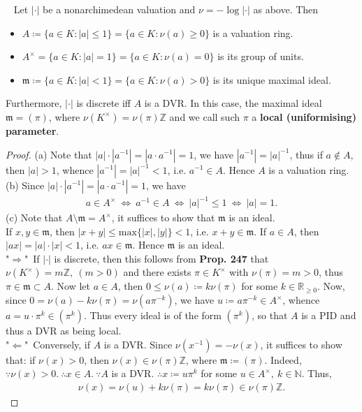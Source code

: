 \documentclass[12pt,a4paper,footinclude=true,headinclude=true]{scrbook} %
\newenvironment{proposition}[2][]
{\renewcommand\theinnercustomprop{#2}\innercustomprop[#1] 
\begin{mdframed}[backgroundcolor=gray!20]\ }
{\end{mdframed}\endinnercustomprop}
\begin{document}
\begin{proposition}{249. (Local Parameter)}
    \newline Let $|\cdot|$ be a nonarchimedean valuation and $\nu=-\log|\cdot|$ as above. Then
    \begin{itemize}
        \item[(a)] $A\coloneqq\{a\in K:|a|\leq1\}=\{a\in K:\nu(a)\geq0\}$ is a valuation ring.
        \item[(b)] $A^\times=\{a\in K:|a|=1\}=\{a\in K:\nu(a)=0\}$ is its group of units.
        \item[(c)] $\mathfrak{m}\coloneqq\{a\in K:|a|<1\}=\{a\in K:\nu(a)>0\}$ is its unique maximal ideal.
    \end{itemize}
    Furthermore, $|\cdot|$ is discrete iff $A$ is a DVR. In this case, the maximal ideal $\mathfrak{m}=(\pi)$, where $\nu(K^\times)=\nu(\pi)\mathbb{Z}$ and we call such $\pi$ a \textbf{local (uniformising) parameter}.
\end{proposition}
\begin{proof}
    (a) Note that $|a|\cdot|a^{-1}|=|a\cdot a^{-1}|=1$, we have $|a^{-1}|=|a|^{-1}$, thus if $a\notin A$, then $|a|>1$, whence $|a^{-1}|=|a|^{-1}<1$, i.e. $a^{-1}\in A$. Hence $A$ is a valuation ring.\\
    (b) Since $|a|\cdot|a^{-1}|=|a\cdot a^{-1}|=1$, we have
    \begin{align*}
        a\in A^\times\ \Leftrightarrow\ a^{-1}\in A\ \Leftrightarrow\ |a|^{-1}\leq1\ \Leftrightarrow\ |a|=1.
    \end{align*}
    (c) Note that $A\setminus\mathfrak{m}=A^\times$, it suffices to show that $\mathfrak{m}$ is an ideal.\\
    If $x,y\in\mathfrak{m}$, then $|x+y|\leq\mathrm{max}\{|x|,|y|\}<1$, i.e. $x+y\in\mathfrak{m}$. If $a\in A$, then $|ax|=|a|\cdot|x|<1$, i.e. $ax\in\mathfrak{m}$. Hence $\mathfrak{m}$ is an ideal.\\
    "$\Rightarrow$"\ If $|\cdot|$ is discrete, then this follows from \textbf{Prop. 247} that $\nu(K^\times)=m\mathbb{Z},\ (m>0)$ and there exists $\pi\in K^\times$ with $\nu(\pi)=m>0$, thus $\pi\in\mathfrak{m}\subset A$. Now let $a\in A$, then $0\leq\nu(a)\coloneqq k\nu(\pi)$ for some $k\in\mathbb{R}_{\geq0}$. Now, since $0=\nu(a)-k\nu(\pi)=\nu(a\pi^{-k})$, we have $u\coloneqq a\pi^{-k}\in A^\times$, whence $a=u\cdot\pi^k\in(\pi^k)$. Thus every ideal is of the form $(\pi^k)$, so that $A$ is a PID and thus a DVR as being local.\\
    "$\Leftarrow$"\ Conversely, if $A$ is a DVR. Since $\nu(x^{-1})=-\nu(x)$, it suffices to show that: if $\nu(x)>0$, then $\nu(x)\in\nu(\pi)\mathbb{Z}$, where $\mathfrak{m}\coloneqq(\pi)$. Indeed, $\because \nu(x)>0.\ \therefore x\in A.\ \because A$ is a DVR. $\therefore x\coloneqq u\pi^k$ for some $u\in A^\times,\ k\in\mathbb{N}$. Thus,
    \begin{align*}
        \nu(x)=\nu(u)+k\nu(\pi)=k\nu(\pi)\in\nu(\pi)\mathbb{Z}.
    \end{align*}
\end{proof}
\end{document}

